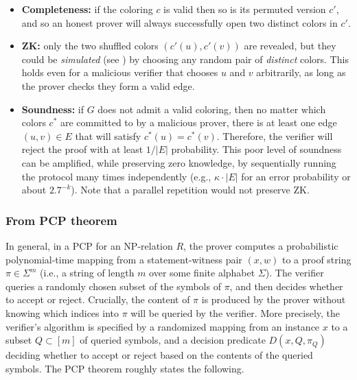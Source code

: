 \begin{itemize}
\item \textbf{Completeness:} if the coloring $c$ is valid then so is its permuted version $c'$, and so an honest prover will always successfully open two distinct colors in $c'$. 
 
\item \textbf{ZK:} only the two shuffled colors $(c'(u),c'(v))$ are revealed, but they could be \emph{simulated} (see ) by choosing any random pair of {\em distinct} colors. 
This holds even for a malicious verifier that chooses $u$ and $v$ arbitrarily, as long as the prover checks they form a valid edge.\loosen

\item \textbf{Soundness:}
if $G$ does not admit a valid coloring, then no matter which colors $c^*$ are committed to by a malicious prover, there is at least one edge $(u,v)\in E$ that will satisfy $c^*(u)=c^*(v)$. 
Therefore, the verifier will reject the proof with at least $1/|E|$ probability. 
This poor level of soundness can be amplified, while preserving zero knowledge, by sequentially running the protocol many times independently  (e.g., $\kappa\cdot|E|$ for an error probability or about $2.7^{-k}$).  
Note that a parallel repetition would not preserve ZK.

\end{itemize}


\subsubsection{From PCP theorem}
\label{paradigms:IT:PCP:from-PCP-theorem}

In general, in a PCP for an NP-relation $R$, the prover computes a probabilistic polynomial-time mapping from a statement-witness pair $(x,w)$ to a proof string $\pi\in\Sigma^m$ (i.e., a string of length $m$ over some finite alphabet $\Sigma$). The verifier queries a randomly chosen subset of the symbols of $\pi$, and then decides whether to accept or reject.
Crucially, the content of $\pi$ is produced by the prover without knowing which indices into $\pi$ will be queried by the verifier.
More precisely, the verifier's algorithm is specified by a randomized mapping from an instance $x$ to a subset $Q\subset[m]$ of queried symbols, and a decision predicate $D(x,Q,\pi_Q)$ deciding whether to accept or reject based on the contents of the queried symbols. 
The PCP theorem \cite{2000:SIAM:Computationally-Sound-Proofs,1992:kilian:note-on-efficient-ZKPs-and-args} roughly states the following.

